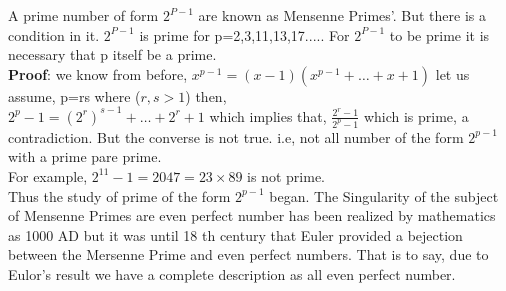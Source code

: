 \documentclass[12pt,,a4paper]{article}
\begin{document}
 A prime number of form \(2^{P-1}\) are known as Mensenne Primes'. But there is a condition in it. \(2^{P-1}\) is prime for p=2,3,11,13,17.....
 For \(2^{P-1}\) to be prime it is necessary that p itself be a prime.\\
\textbf{Proof}: we know from before, $x^{p-1} = (x-1)(x^{p-1} + \ldots + x + 1)$ let us assume, p=rs where (\(r, s > 1\)) then, \\
 \(2^p-1 = (2^r)^{s-1}+\ldots+2^r+1\) which implies that, \(\frac{{2^r-1}}{{2^p-1}}\)  which is prime, a contradiction. But the converse is not true. i.e, not all number of the form \(2^{p-1}\) with a prime pare prime. \\
For example, \(2^{11}-1=2047=23 \times 89\) is not prime. \\
Thus the study of prime of the form \(2^{p-1}\) began. The Singularity of the subject of Mensenne Primes are even perfect number has been realized by mathematics as 1000 AD but it was until 18 th century that Euler provided a bejection between the Mersenne Prime and even perfect numbers. That is to say, due to Eulor's result we have a complete description as all even perfect number. \\ \vspace{20pt}
\end{document}
